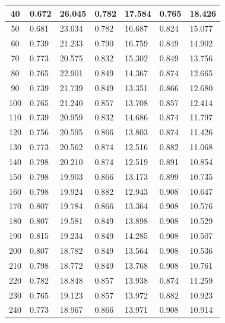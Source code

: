 \documentclass{report}
\begin{document}
\begin{minipage}{\textwidth}
\begin{longtable}{|c|l|l|l|l|l|l|}
                     40 & 0.672 & 26.045 & 0.782 & 17.584 & 0.765 & 18.426 \\ \hline
                     50 & 0.681 & 23.634 & 0.782 & 16.687 & 0.824 & 15.077 \\ \hline
                     60 & 0.739 & 21.233 & 0.790 & 16.759 & 0.849 & 14.902 \\ \hline
                     70 & 0.773 & 20.575 & 0.832 & 15.302 & 0.849 & 13.756 \\ \hline
                     80 & 0.765 & 22.901 & 0.849 & 14.367 & 0.874 & 12.665 \\ \hline
                     90 & 0.739 & 21.739 & 0.849 & 13.351 & 0.866 & 12.680 \\ \hline
                     100 & 0.765 & 21.240 & 0.857 & 13.708 & 0.857 & 12.414 \\ \hline
                     110 & 0.739 & 20.959 & 0.832 & 14.686 & 0.874 & 11.797 \\ \hline
                     120 & 0.756 & 20.595 & 0.866 & 13.803 & 0.874 & 11.426 \\ \hline
                     130 & 0.773 & 20.562 & 0.874 & 12.516 & 0.882 & 11.068 \\ \hline
                     140 & 0.798 & 20.210 & 0.874 & 12.519 & 0.891 & 10.854 \\ \hline
                     150 & 0.798 & 19.903 & 0.866 & 13.173 & 0.899 & 10.735 \\ \hline
                     160 & 0.798 & 19.924 & 0.882 & 12.943 & 0.908 & 10.647 \\ \hline
                     170 & 0.807 & 19.784 & 0.866 & 13.364 & 0.908 & 10.576 \\ \hline
                     180 & 0.807 & 19.581 & 0.849 & 13.898 & 0.908 & 10.529 \\ \hline
                     190 & 0.815 & 19.234 & 0.849 & 14.285 & 0.908 & 10.507 \\ \hline
                     200 & 0.807 & 18.782 & 0.849 & 13.564 & 0.908 & 10.536 \\ \hline
                     210 & 0.798 & 18.772 & 0.849 & 13.768 & 0.908 & 10.761 \\ \hline
                     220 & 0.782 & 18.848 & 0.857 & 13.938 & 0.874 & 11.259 \\ \hline
                     230 & 0.765 & 19.123 & 0.857 & 13.972 & 0.882 & 10.923 \\ \hline
                     240 & 0.773 & 18.967 & 0.866 & 13.971 & 0.908 & 10.914 \\ \hline

\end{longtable}
\end{minipage}
\end{document}
